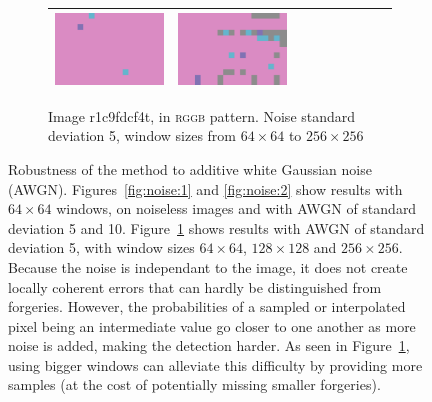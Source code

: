 \documentclass{ipol}
\begin{document}
\begin{figure}[ht]
\begin{subfigure}[t]{\linewidth}
\begin{tabular}{ccccccccc}
                \includegraphics[width=\s]{images/tower/PPG/bid_n5_256_grids.png}&
                \includegraphics[width=\s]{images/tower/VNG/bid_n5_256_grids.png}\\
                \bottomrule
        \end{tabular}
        \caption{Image r1c9fdcf4t, in \textsc{rggb} pattern. Noise standard deviation 5, window sizes from $64\times64$ to $256\times256$}
        \label{fig:noise:3}
\end{subfigure}
\caption{Robustness of the method to additive white Gaussian noise (AWGN). Figures~\ref{fig:noise:1} and \ref{fig:noise:2} show results with $64\times64$ windows, on noiseless images and with AWGN of standard deviation 5 and 10. Figure~\ref{fig:noise:3} shows results with AWGN of standard deviation 5, with window sizes $64\times64$, $128\times128$ and $256\times256$. Because the noise is independant to the image, it does not create locally coherent errors that can hardly be distinguished from forgeries. However, the probabilities of a sampled or interpolated pixel being an intermediate value go closer to one another as more noise is added, making the detection harder. As seen in Figure~\ref{fig:noise:3}, using bigger windows can alleviate this difficulty by providing more samples (at the cost of potentially missing smaller forgeries).}
\label{fig:noise}
\end{figure}
\end{document}
